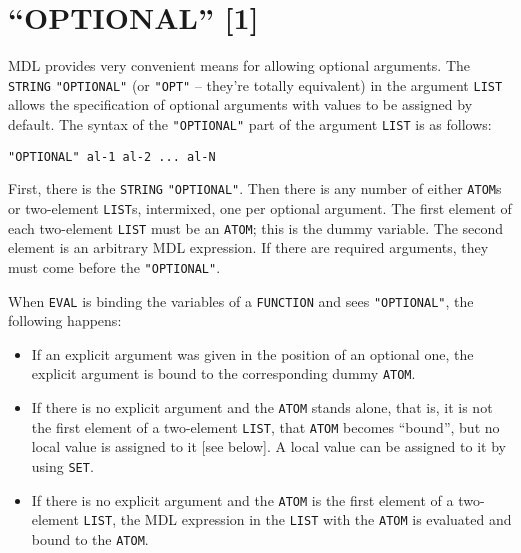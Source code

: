 \documentclass[a4paper]{scrbook}
\providecommand{\tightlist}{%
  \setlength{\itemsep}{0pt}\setlength{\parskip}{0pt}}
\begin{document}
\section{\texorpdfstring{``OPTIONAL'' {[}1{]}}{9.1. OPTIONAL {[}1{]}}}\label{optional-1}

MDL provides very convenient means for allowing optional arguments. The \texttt{STRING} \texttt{"OPTIONAL"} (or
\texttt{"OPT"}   -- they're totally equivalent) in the
argument \texttt{LIST} allows the specification of optional arguments with values to be assigned by default. The syntax of
the \texttt{"OPTIONAL"} part of the argument \texttt{LIST} is as follows:

\begin{verbatim}
"OPTIONAL" al-1 al-2 ... al-N
\end{verbatim}

First, there is the \texttt{STRING} \texttt{"OPTIONAL"}. Then there is any number of either \texttt{ATOM}s or two-element
\texttt{LIST}s, intermixed, one per optional argument. The first element of each two-element \texttt{LIST} must be an
\texttt{ATOM}; this is the dummy variable. The second element is an arbitrary MDL expression. If there are required
arguments, they must come before the \texttt{"OPTIONAL"}.

When \texttt{EVAL} is binding the variables of a \texttt{FUNCTION} and sees \texttt{"OPTIONAL"}, the following happens:

\begin{itemize}
\tightlist
\item
  If an explicit argument was given in the position of an optional one, the explicit argument is bound to the corresponding
  dummy \texttt{ATOM}.
\item
  If there is no explicit argument and the \texttt{ATOM} stands alone, that is, it is not the first element of a
  two-element \texttt{LIST}, that \texttt{ATOM} becomes ``bound'', but no local value is assigned to it {[}see below{]}. A
  local value can be assigned to it by using \texttt{SET}.
\item
  If there is no explicit argument and the \texttt{ATOM} is the first element of a two-element \texttt{LIST}, the MDL
  expression in the \texttt{LIST} with the \texttt{ATOM} is evaluated and bound to the \texttt{ATOM}.
\end{itemize}
\end{document}
